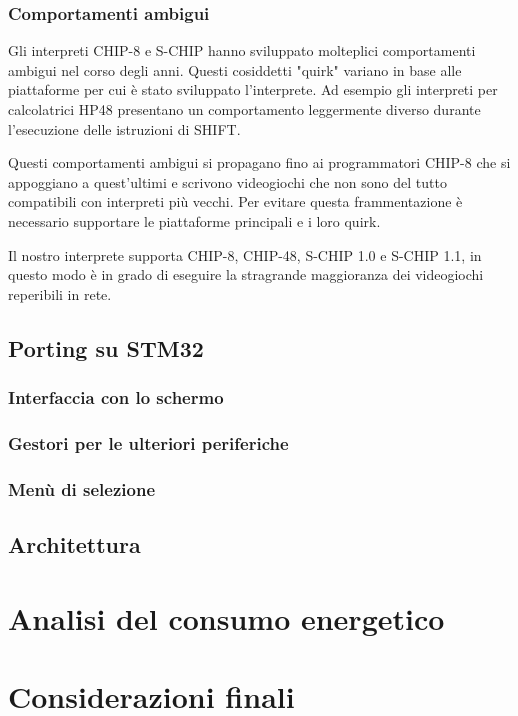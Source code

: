 \documentclass[a4paper]{article}
\begin{document}
\subsubsection{Comportamenti ambigui}

Gli interpreti CHIP-8 e S-CHIP hanno sviluppato molteplici
comportamenti ambigui nel corso degli anni. Questi cosiddetti
"quirk" variano in base alle piattaforme per cui è stato sviluppato
l'interprete. Ad esempio gli interpreti per calcolatrici HP48
presentano un comportamento leggermente diverso durante l'esecuzione
delle istruzioni di SHIFT.

Questi comportamenti ambigui si propagano fino ai programmatori
CHIP-8 che si appoggiano a quest'ultimi e scrivono videogiochi che
non sono del tutto compatibili con interpreti più vecchi. Per evitare
questa frammentazione è necessario supportare le piattaforme
principali e i loro quirk.

Il nostro interprete supporta CHIP-8, CHIP-48, S-CHIP 1.0 e
S-CHIP 1.1, in questo modo è in grado di eseguire la stragrande
maggioranza dei videogiochi reperibili in rete.

\subsection{Porting su STM32}

\subsubsection{Interfaccia con lo schermo}

\subsubsection{Gestori per le ulteriori periferiche}

\subsubsection{Menù di selezione}

\subsection{Architettura}




\section{Analisi del consumo energetico} %


\section{Considerazioni finali} %




\end{document}

